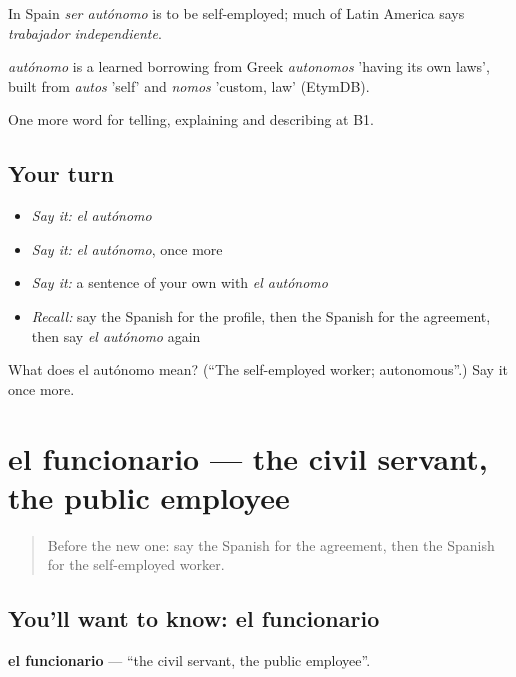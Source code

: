 In Spain \emph{ser autónomo} is to be self-employed; much of Latin America says \emph{trabajador independiente}.

\begin{cousinweb}
\emph{autónomo} is a learned borrowing from Greek \emph{autonomos} 'having its own laws', built from \emph{autos} 'self' and \emph{nomos} 'custom, law' (EtymDB).
\end{cousinweb}

\begin{grammarlens}[title={What you've built}]
One more word for telling, explaining and describing at B1.
\end{grammarlens}

\subsection*{Your turn}
\begin{itemize}
\raggedright
  \item \emph{Say it:} \emph{el autónomo}
  \item \emph{Say it:} \emph{el autónomo}, once more
  \item \emph{Say it:} a sentence of your own with \emph{el autónomo}
  \item \emph{Recall:} say the Spanish for the profile, then the Spanish for the agreement, then say \emph{el autónomo} again
\end{itemize}

\begin{tcolorbox}[breakable,colback=teal!4,colframe=teal!35!black,title={Before you move on}]
What does el autónomo mean? (\textquotedblleft{}The self-employed worker; autonomous\textquotedblright{}.) Say it once more.
\end{tcolorbox}
\section[el funcionario]{el funcionario — the civil servant, the public employee}

\label{lesson:ES-C591-funcionario}



\begin{quote}
Before the new one: say the Spanish for the agreement, then the Spanish for the self-employed worker.
\end{quote}

\subsection*{You'll want to know: el funcionario}
\textbf{el funcionario} — \textquotedblleft{}the civil servant, the public employee\textquotedblright{}.

